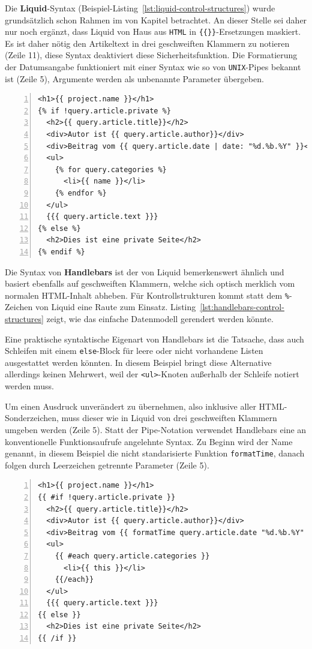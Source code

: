 Die \textbf{Liquid}-Syntax (Beispiel-Listing~\ref{lst:liquid-control-structures}) wurde grundsätzlich schon Rahmen im von Kapitel  betrachtet. An dieser Stelle sei daher nur noch ergänzt, dass Liquid von Haus aus \texttt{HTML} in \texttt{\{\{\}\}}-Ersetzungen maskiert. Es ist daher nötig den Artikeltext in drei geschweiften Klammern zu notieren (Zeile 11), diese Syntax deaktiviert diese Sicherheitsfunktion. Die Formatierung der Datumsangabe funktioniert mit einer Syntax wie so von \texttt{UNIX}-Pipes bekannt ist (Zeile 5), Argumente werden als unbenannte Parameter übergeben.

\begin{lstlisting}[float=h, numbers=left, caption={Blogartikel mit Liquid}, label={lst:liquid-control-structures}]
<h1>{{ project.name }}</h1>
{% if !query.article.private %}
  <h2>{{ query.article.title}}</h2>
  <div>Autor ist {{ query.article.author}}</div>
  <div>Beitrag vom {{ query.article.date | date: "%d.%b.%Y" }}</div>
  <ul>
    {% for query.categories %}
      <li>{{ name }}</li>
    {% endfor %}
  </ul>
  {{{ query.article.text }}}
{% else %}
  <h2>Dies ist eine private Seite</h2>
{% endif %}
\end{lstlisting}

Die Syntax von \textbf{Handlebars} ist der von Liquid bemerkenswert ähnlich und basiert ebenfalls auf geschweiften Klammern, welche sich optisch merklich vom normalen HTML-Inhalt abheben. Für Kontrollstrukturen kommt statt dem \texttt{\%}-Zeichen von Liquid eine Raute zum Einsatz. Listing~\ref{lst:handlebars-control-structures} zeigt, wie das einfache Datenmodell gerendert werden könnte.

Eine praktische syntaktische Eigenart von Handlebars ist die Tatsache, dass auch Schleifen mit einem \texttt{else}-Block für leere oder nicht vorhandene Listen ausgestattet werden könnten. In diesem Beispiel bringt diese Alternative allerdings keinen Mehrwert, weil der \texttt{<ul>}-Knoten außerhalb der Schleife notiert werden muss.

Um einen Ausdruck unverändert zu übernehmen, also inklusive aller HTML-Sonderzeichen, muss dieser wie in Liquid von drei geschweiften Klammern umgeben werden (Zeile 5). Statt der Pipe-Notation verwendet Handlebars eine an konventionelle Funktionsaufrufe angelehnte Syntax. Zu Beginn wird der Name genannt, in diesem Beispiel die nicht standarisierte Funktion \texttt{formatTime}, danach folgen durch Leerzeichen getrennte Parameter (Zeile 5).

\begin{lstlisting}[float=h, numbers=left, caption={Blogartikel mit Handlebars}, label={lst:handlebars-control-structures}]
<h1>{{ project.name }}</h1>
{{ #if !query.article.private }}
  <h2>{{ query.article.title}}</h2>
  <div>Autor ist {{ query.article.author}}</div>
  <div>Beitrag vom {{ formatTime query.article.date "%d.%b.%Y" }}</div>
  <ul>
    {{ #each query.article.categories }}
      <li>{{ this }}</li>
    {{/each}}
  </ul>
  {{{ query.article.text }}}
{{ else }}
  <h2>Dies ist eine private Seite</h2>
{{ /if }}
\end{lstlisting}

